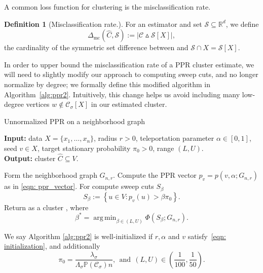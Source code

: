 \documentclass[11pt,twoside]{article}
\theoremstyle{definition}
\newtheorem{definition}{Definition}
\newcommand{\set}[1]{\left\{#1\right\}}
\newcommand{\abs}[1]{\left \lvert #1 \right \rvert}
\newcommand{\Reals}{\mathbb{R}}
\newcommand{\1}{\mathbbm{1}}
\newcommand{\pbf}{p}        %
\newcommand{\Xbf}{X}
\newcommand{\Pbb}{\mathbb{P}}
\newcommand{\Cset}{\mathcal{C}}
\newcommand{\Csig}{\Cset_{\sigma}}
\newcommand{\Cest}{\widehat{C}}
\DeclareMathOperator*{\argmin}{arg\,min}
\begin{document}
A common loss function for clustering is the misclassification rate.
\begin{definition}[Misclassification rate.]
	\label{def: symmetric_set_diff}
	For an estimator \smash{$\Cest \subseteq \Xbf$} and set
	$\mathcal{S} \subseteq \Reals^d$, we define   
	\begin{equation}
	\label{eqn: misclassification_rate}
	\Delta_{\textrm{mc}}(\Cest, \mathcal{S}) := \abs{\Cset \vartriangle \mathcal{S}[\Xbf]},
	\end{equation}
	the cardinality of the symmetric set difference between 
	\smash{$\Cest$} and $\mathcal{S} \cap \Xbf = \mathcal{S}[\Xbf]$. 
\end{definition}

In order to upper bound the misclassification rate of a PPR cluster estimate, we will need to slightly modify our approach to computing sweep cuts, and no longer normalize by degree; we formally define this modified algorithm in Algorithm~\ref{alg:ppr2}. Intuitively, this change helps us avoid including many low-degree vertices $w \not\in \Csig[\Xbf]$ in our estimated cluster.
\begin{algorithm}
	\caption{Unnormalized PPR on a neighborhood graph}
	\label{alg:ppr2}	
	{\bfseries Input:} data $\Xbf=\{x_1,\ldots,x_n\}$, radius $r > 0$, teleportation
	parameter $\alpha \in [0,1]$, seed $v \in \Xbf$, target stationary probability
	$\pi_0 > 0$, range $(L,U)$. \\     
	{\bfseries Output:} cluster $\Cest \subseteq V$.
	\begin{algorithmic}[1]
		\STATE Form the neighborhood graph $G_{n,r}$.
		\STATE Compute the PPR vector $p_v=\pbf(v, \alpha; G_{n,r})$ as in \eqref{eqn: 
			ppr_vector}. 
		\STATE For  compute sweep cuts 
		$S_{\beta}$
		\begin{equation}
		\label{eqn:sweep_cuts2}
		S_\beta := \set{u \in V: p_v(u) > \beta \pi_0}.
		\end{equation}
		\STATE Return as a cluster \smash{$\Cest_{\textrm{un}} = S_{\beta^*}$}, where  
		$$
		\beta^* = \argmin_{\beta \in (L,U)} \Phi(S_{\beta}; G_{n,r}).
		$$
	\end{algorithmic}
\end{algorithm}

We say Algorithm \ref{alg:ppr2} is well-initialized if $r,\alpha$ and $v$ satisfy~\eqref{eqn: initialization}, and additionally
\begin{equation}
\label{eqn:initialization_2}
\pi_0 = \frac{\lambda_{\sigma}}{\Lambda_{\sigma}\Pbb(\Csig)n}, ~~\textrm{and}~~ (L,U) \in \left(\frac{1}{100},\frac{1}{50}\right).
\end{equation}
\end{document}
